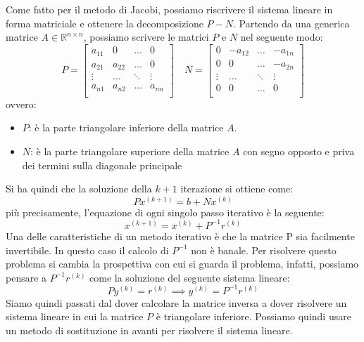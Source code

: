 Come fatto per il metodo di Jacobi, possiamo riscrivere il sistema lineare in
forma matriciale e ottenere la decomposizione $P-N$. Partendo da una generica
matrice $A \in \mathbb{R}^{n \times n}$, possiamo scrivere le matrici $P$ e $N$
nel seguente modo:
\begin{equation*}
    P= \left[\begin{array}{cccc}
            a_{11} & 0      & \dots  & 0      \\
            a_{21} & a_{22} & \dots  & 0      \\
            \vdots & \dots  & \ddots & \vdots \\
            a_{n1} & a_{n2} & \dots  & a_{nn} \\
        \end{array}\right]
    \quad
    N= \left[\begin{array}{cccc}
            0      & -a_{12} & \dots  & -a_{1n} \\
            0      & 0       & \dots  & -a_{2n} \\
            \vdots & \dots   & \ddots & \vdots  \\
            0      & 0       & \dots  & 0       \\
        \end{array}\right]
\end{equation*}
ovvero:
\begin{itemize}
    \item $P$: è la parte triangolare inferiore della matrice $A$.
    \item $N$: è la parte triangolare superiore della matrice $A$ con segno
          opposto e priva dei termini sulla diagonale principale
\end{itemize}
Si ha quindi che la soluzione della $k + 1$ iterazione si ottiene come:
\begin{equation*}
    Px^{(k + 1)} = b + Nx^{(k)}
\end{equation*}
più precisamente, l'equazione di ogni singolo passo iterativo è la seguente:
\begin{equation*}
    x^{(k + 1)} = x^{(k)} + P^{-1}r^{(k)}
\end{equation*}
Una delle caratteristiche di un metodo iterativo è che la matrice P sia facilmente
invertibile. In questo caso il calcolo di $P^{-1}$ non è banale. Per risolvere
questo problema si cambia la prospettiva con cui si guarda il problema, infatti,
possiamo pensare a $P^{-1}r^{(k)}$ come la soluzione del seguente sistema lineare:
\begin{equation*}
    Py^{(k)} = r^{(k)} \implies y^{(k)} = P^{-1}r^{(k)}
\end{equation*}
Siamo quindi passati dal dover calcolare la matrice inversa a dover risolvere un
sistema lineare in cui la matrice $P$ è triangolare inferiore. Possiamo quindi
usare un metodo di sostituzione in avanti per risolvere il sistema lineare.

